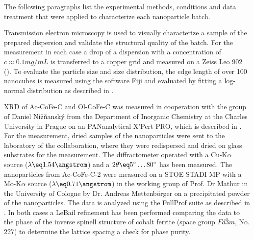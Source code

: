 \documentclass[\main/dresen_thesis.tex]{subfiles}
\begin{document}
  \label{sec:monolayers:nanoparticle:structuralCharacterization}
  The following paragraphs list the experimental methods, conditions and data treatment that were applied to characterize each nanoparticle batch.

    Transmission electron microscopy is used to visually characterize a sample of the prepared dispersion and validate the structural quality of the batch.
    For the measurement in each case a drop of a dispersion with a concentration of $c \approx 0.1 \unit{mg/mL}$ is transferred to a copper grid and measured on a Zeiss Leo 902 ().
    To evaluate the particle size and size distribution, the edge length of over 100 nanocubes is measured using the software Fiji \cite{Schindelin_2012_Fijia} and evaluated by fitting a log-normal distribution as described in .

    XRD of Ac-CoFe-C and Ol-CoFe-C was measured in cooperation with the group of Daniel Nižňanský from the Department of Inorganic Chemistry at the Charles University in Prague on an PANanalytical X'Pert PRO, which is described in .
    For the measurement, dried samples of the nanoparticles were sent to the laboratory of the collaboration, where they were redispersed and dried on glass substrates for the measurement.
    The diffractometer operated with a Cu-K$\alpha$ source ($\lambda \eq 1.54 \angstrom$) and a $2 \theta \eq 5^\circ \ldots 80^\circ$ has been measured.
    The nanoparticles from Ac-CoFe-C-2 were measured on a STOE STADI MP with a Mo-K$\alpha$ source ($\lambda \eq 0.71 \angstrom$) in the working group of Prof. Dr Mathur in the University of Cologne by Dr. Andreas Mettenb\"orger on a precipitated powder of the nanoparticles.
    The data is analyzed using the FullProf suite \cite{Rodriguez_1993_Recen} as described in .
    In both cases a LeBail refinement has been performed comparing the data to the phase of the inverse spinell structure of cobalt ferrite (space group $Fd\bar{3}m$, No. 227) to determine the lattice spacing a check for phase purity.
\end{document}
